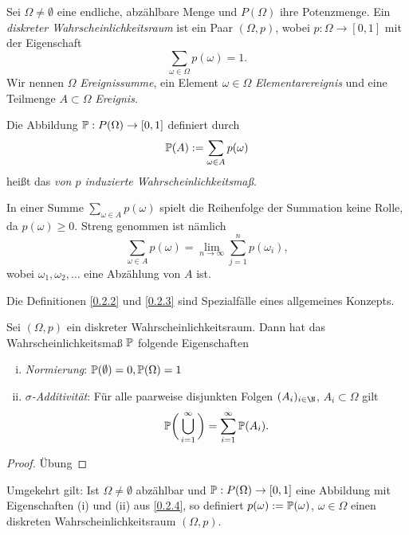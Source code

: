 \begin{df} \label{0.2.2}
	Sei $\Omega \neq \emptyset$ eine endliche, abzählbare Menge und $P(\Omega)$ ihre Potenzmenge.
	Ein \emph{diskreter Wahrscheinlichkeitsraum} ist ein Paar $(\Omega, p)$, wobei $p: \Omega \to [0,1]$ mit der Eigenschaft
	\[
		\sum_{\omega \in \Omega} p(\omega) = 1.
	\]
	Wir nennen $\Omega$ \emph{Ereignissumme}, ein Element $\omega \in \Omega$ \emph{Elementarereignis} und eine Teilmenge $A \subset \Omega$ \emph{Ereignis}.
\end{df}

\begin{df} \label{0.2.3}
	Die Abbildung $\P : P(\Omega) \to [0,1]$ definiert durch
	\[
		\P(A) := \sum_{\omega \in A} p(\omega)
	\]
	heißt das \emph{von $p$ induzierte Wahrscheinlichkeitsmaß}.
\end{df}

\begin{nt*}
	In einer Summe $\sum_{\omega \in A} p(\omega)$ spielt die Reihenfolge der Summation keine Rolle, da $p(\omega) \ge 0$.
	Streng genommen ist nämlich
	\[
		\sum_{\omega \in A} p(\omega)
		= \lim_{n\to \infty} \sum_{j=1}^n p(\omega_i),
	\]
	wobei $\omega_1, \omega_2, \dotsc$ eine Abzählung von $A$ ist.
\end{nt*}

Die Definitionen \ref{0.2.2} und \ref{0.2.3} sind Spezialfälle eines allgemeines Konzepts.

\begin{nt} \label{0.2.4}
	Sei $(\Omega, p)$ ein diskreter Wahrscheinlichkeitsraum.
	Dann hat das Wahrscheinlichkeitsmaß $\P$ folgende Eigenschaften
	\begin{enumerate}[(i)]
		\item
			\emph{Normierung}:
			$\P(\emptyset) = 0, \P(\Omega) = 1$
		\item
			\emph{$\sigma$-Additivität}:
			Für alle paarweise disjunkten Folgen $(A_i)_{i \in \N}$, $A_i \subset \Omega$ gilt
			\[
				\P \bigg( \bigcup_{i=1}^\infty \bigg) = \sum_{i=1}^\infty \P(A_i).
			\]
	\end{enumerate}
	\begin{proof}
		Übung
	\end{proof}
\end{nt}

\begin{nt} \label{0.2.5}
	Umgekehrt gilt:
	Ist $\Omega \neq \emptyset$ abzählbar und $\P : P(\Omega) \to [0,1]$ eine Abbildung mit Eigenschaften (i) und (ii) aus \ref{0.2.4}, so definiert $p(\omega) := \P({\omega})$, $\omega \in \Omega$ einen diskreten Wahrscheinlichkeitsraum $(\Omega, p)$.
\end{nt}


